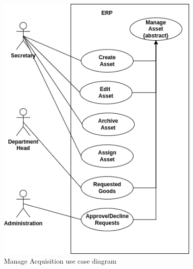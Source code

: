 
\clearpage
\begin{figure}[!ht]
\centering
\includegraphics[width=10cm,keepaspectratio]{usecases/asset.drawio.png}
\caption{Manage Acquisition use case diagram }
\end{figure}

